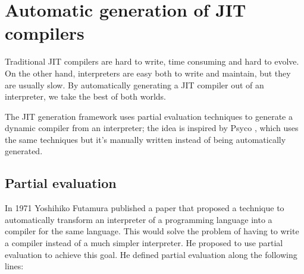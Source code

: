 \section{Automatic generation of JIT compilers}

Traditional JIT compilers are hard to write, time consuming and hard to
evolve.  On the other hand, interpreters are easy both to write and maintain,
but they are usually slow.  By automatically generating a JIT compiler out of
an interpreter, we take the best of both worlds.


The JIT generation framework uses partial evaluation techniques to generate a
dynamic compiler from an interpreter; the idea is inspired by Psyco \cite{DBLP:conf/pepm/Rigo04}, which
uses the same techniques but it's manually written instead of being
automatically generated.

\subsection{Partial evaluation}

In 1971 Yoshihiko Futamura published a paper \cite{Futamura99} that proposed a
technique to automatically transform an interpreter of a programming language
into a compiler for the same language. This would solve the problem of having to
write a compiler instead of a much simpler interpreter. He proposed to use
partial evaluation to achieve this goal. He defined partial evaluation along the following lines:

